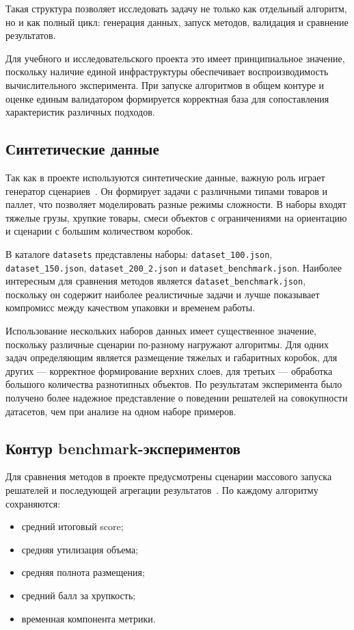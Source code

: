 \documentclass[14pt,a4paper]{extarticle}
\begin{document}
Такая структура позволяет исследовать задачу не только как отдельный алгоритм, но и как полный цикл: генерация данных, запуск методов, валидация и сравнение результатов.

Для учебного и исследовательского проекта это имеет принципиальное значение, поскольку наличие единой инфраструктуры обеспечивает воспроизводимость вычислительного эксперимента. При запуске алгоритмов в общем контуре и оценке единым валидатором формируется корректная база для сопоставления характеристик различных подходов.

\subsection{Синтетические данные}

Так как в проекте используются синтетические данные, важную роль играет генератор сценариев~\cite{project_repo}. Он формирует задачи с различными типами товаров и паллет, что позволяет моделировать разные режимы сложности. В наборы входят тяжелые грузы, хрупкие товары, смеси объектов с ограничениями на ориентацию и сценарии с большим количеством коробок.

В каталоге \texttt{datasets} представлены наборы: 
\texttt{dataset\_100.json}, 
\newline
\texttt{dataset\_150.json}, \texttt{dataset\_200\_2.json} и \texttt{dataset\_benchmark.json}. Наиболее интересным для сравнения методов является \texttt{dataset\_benchmark.json}, поскольку он содержит наиболее реалистичные задачи и лучше показывает компромисс между качеством упаковки и временем работы.

Использование нескольких наборов данных имеет существенное значение, поскольку различные сценарии по-разному нагружают алгоритмы. Для одних задач определяющим является размещение тяжелых и габаритных коробок, для других --- корректное формирование верхних слоев, для третьих --- обработка большого количества разнотипных объектов. По результатам эксперимента было получено более надежное представление о поведении решателей на совокупности датасетов, чем при анализе на одном наборе примеров.

\subsection{Контур benchmark-экспериментов}

Для сравнения методов в проекте предусмотрены сценарии массового запуска решателей и последующей агрегации результатов~\cite{project_repo}. По каждому алгоритму сохраняются:
\begin{itemize}
  \item средний итоговый score;
  \item средняя утилизация объема;
  \item средняя полнота размещения;
  \item средний балл за хрупкость;
  \item временная компонента метрики.
\end{itemize}
\end{document}
